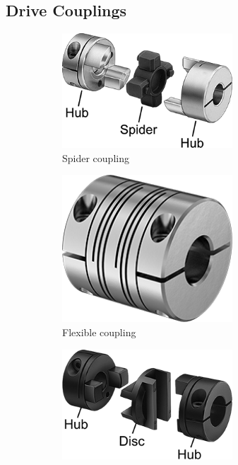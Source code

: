 \subsection{Drive Couplings}
	\begin{figure}[H]	
		\begin{subfigure}[b]{.24\linewidth}
			\includegraphics[width=0.7\textwidth]{imgs/coupling_spider.png}
			\caption{Spider coupling}
		\end{subfigure}
		\begin{subfigure}[b]{.24\linewidth}
			\includegraphics[width=0.7\textwidth]{imgs/coupling_flexible.png}
			\caption{Flexible coupling}
		\end{subfigure}
		\begin{subfigure}[b]{.24\linewidth}
			\includegraphics[width=0.7\textwidth]{imgs/coupling_oldham.png}

\end{subfigure}
\end{figure}
